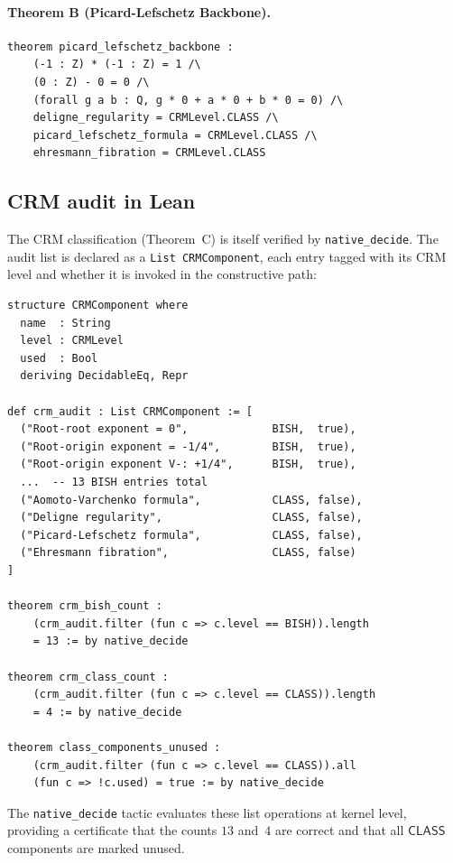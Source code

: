 \documentclass[11pt]{article}
\theoremstyle{plain}
\theoremstyle{definition}
\theoremstyle{remark}
\newcommand{\CLASS}{\mathsf{CLASS}}
\begin{document}
\paragraph{Theorem B (Picard-Lefschetz Backbone).}
{\small
\begin{verbatim}
theorem picard_lefschetz_backbone :
    (-1 : Z) * (-1 : Z) = 1 /\
    (0 : Z) - 0 = 0 /\
    (forall g a b : Q, g * 0 + a * 0 + b * 0 = 0) /\
    deligne_regularity = CRMLevel.CLASS /\
    picard_lefschetz_formula = CRMLevel.CLASS /\
    ehresmann_fibration = CRMLevel.CLASS
\end{verbatim}
}

\subsection{CRM audit in Lean}

The CRM classification (Theorem~C) is itself verified by \texttt{native\_decide}.
The audit list is declared as a \texttt{List CRMComponent}, each entry tagged with
its CRM level and whether it is invoked in the constructive path:

{\small
\begin{verbatim}
structure CRMComponent where
  name  : String
  level : CRMLevel
  used  : Bool
  deriving DecidableEq, Repr

def crm_audit : List CRMComponent := [
  ("Root-root exponent = 0",             BISH,  true),
  ("Root-origin exponent = -1/4",        BISH,  true),
  ("Root-origin exponent V-: +1/4",      BISH,  true),
  ...  -- 13 BISH entries total
  ("Aomoto-Varchenko formula",           CLASS, false),
  ("Deligne regularity",                 CLASS, false),
  ("Picard-Lefschetz formula",           CLASS, false),
  ("Ehresmann fibration",                CLASS, false)
]

theorem crm_bish_count :
    (crm_audit.filter (fun c => c.level == BISH)).length
    = 13 := by native_decide

theorem crm_class_count :
    (crm_audit.filter (fun c => c.level == CLASS)).length
    = 4 := by native_decide

theorem class_components_unused :
    (crm_audit.filter (fun c => c.level == CLASS)).all
    (fun c => !c.used) = true := by native_decide
\end{verbatim}
}

\noindent
The \texttt{native\_decide} tactic evaluates these list operations at kernel level,
providing a certificate that the counts $13$ and~$4$ are correct and that
all $\CLASS$ components are marked unused.
\end{document}
